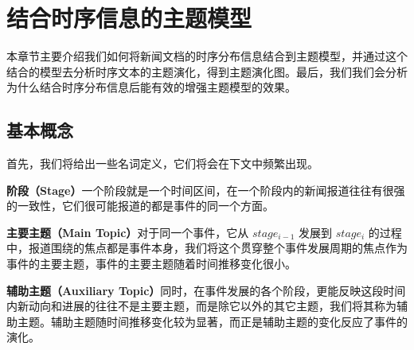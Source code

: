 \section{结合时序信息的主题模型}
本章节主要介绍我们如何将新闻文档的时序分布信息结合到主题模型，并通过这个结合的模型去分析时序文本的主题演化，得到主题演化图。最后，我们我们会分析为什么结合时序分布信息后能有效的增强主题模型的效果。
\subsection{基本概念}
\label{sec:concepts}
首先，我们将给出一些名词定义，它们将会在下文中频繁出现。

\textbf{阶段（Stage）}一个阶段就是一个时间区间，在一个阶段内的新闻报道往往有很强的一致性，它们很可能报道的都是事件的同一个方面。

\textbf{主要主题（Main Topic）}对于同一个事件，它从 $stage_{i-1}$ 发展到 $stage_i$  的过程中，报道围绕的焦点都是事件本身，我们将这个贯穿整个事件发展周期的焦点作为事件的主要主题，事件的主要主题随着时间推移变化很小。

\textbf{辅助主题（Auxiliary Topic）}同时，在事件发展的各个阶段，更能反映这段时间内新动向和进展的往往不是主要主题，而是除它以外的其它主题，我们将其称为辅助主题。辅助主题随时间推移变化较为显著，而正是辅助主题的变化反应了事件的演化。

